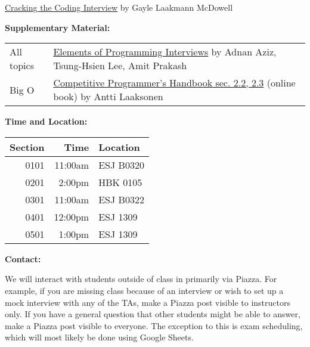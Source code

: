 \documentclass[12pt]{article}
\begin{document}
\noindent\href{https://www.amazon.com/Cracking-Coding-Interview-Programming-Questions/dp/0984782850/}{Cracking the Coding Interview}
{\small by Gayle Laakmann McDowell} \medskip

\noindent\textbf{Supplementary Material: }

\begin{table}[hbt!]
  \begin{tabular}{@{}ll}
    All topics & \href{https://www.amazon.com/Elements-Programming-Interviews-Python-Insiders/dp/1537713949}{Elements of Programming Interviews} {\small by Adnan Aziz, Tsung-Hsien Lee, Amit Prakash} \\
    Big O & \href{https://cses.fi/book/index.html}{Competitive Programmer's Handbook sec. 2.2, 2.3} {\small (online book) by Antti Laaksonen} \\
  \end{tabular}
\end{table}


\medskip

\noindent\textbf{Time and Location:}

\begin{table}[H]
  \begin{tabular}{rrl}
    Section & Time    & Location  \\
    \hline
    0101 & 11:00am & ESJ B0320 \\
    0201 & 2:00pm  & HBK 0105  \\
    0301 & 11:00am & ESJ B0322 \\
    0401 & 12:00pm & ESJ 1309  \\
    0501 & 1:00pm  & ESJ 1309
  \end{tabular}
\end{table}
\medskip
\newpage %
\noindent\textbf{Contact: }

\noindent We will interact with students outside of class in primarily via Piazza.
For example, if you are missing class because of an interview or
wish to set up a mock interview with any of the TAs, make a Piazza post
visible to instructors only.
If you have a general question that other students might be able to answer,
make a Piazza post visible to everyone.
The exception to this is exam scheduling, which will most likely be done using Google Sheets.

\end{document}
